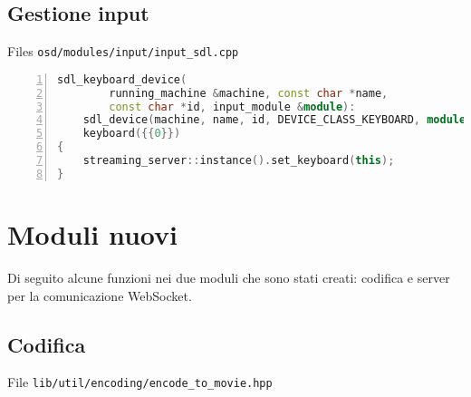 \subsection{Gestione input}
Files \verb|osd/modules/input/input_sdl.cpp|

\begin{lstlisting}[language=C++, numbers=left, tabsize=4]
sdl_keyboard_device(
		running_machine &machine, const char *name,
		const char *id, input_module &module): 
	sdl_device(machine, name, id, DEVICE_CLASS_KEYBOARD, module),
	keyboard({{0}})
{
	streaming_server::instance().set_keyboard(this);
}
\end{lstlisting}

\section{Moduli nuovi}
Di seguito alcune funzioni nei due moduli che sono stati creati: codifica e server per la comunicazione WebSocket.


\subsection{Codifica}
File \verb|lib/util/encoding/encode_to_movie.hpp|

